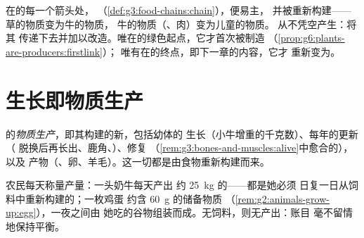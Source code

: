 \begin{remark}\label{rem:g6:matter-from-food:hands}
在的每一个箭头处，
（\cref{def:g3:food-chains:chain}），便易主，
并被重新构建——草的物质变为牛的物质，
牛的物质（、肉）变为儿童的物质。
\emph{}从不凭空产生：将其
传递下去并加以改造。唯在的绿色起点，它才首次被制造
（\cref{prop:g6:plants-are-producers:firstlink}）；
唯有在的终点，即下一章的内容，它才
重新变为。
\end{remark}

\section{生长即物质生产}

\begin{definition}[动物的物质生产]\label{def:g6:matter-from-food:production}
的\emph{物质生产}，即其构建的新，包括幼体的
生长（小牛增重的千克数）、每年的更新（
脱换后再长出、鹿角、）、修复
（\cref{rem:g3:bones-and-muscles:alive}中愈合的），以及
产物（、卵、羊毛）。这一切都是由食物重新构建而来。
\end{definition}

\begin{example}[称量物质生产]\label{ex:g6:matter-from-food:weighing}
农民每天称量产量：一头奶牛每天产出
约 \qty{25}{kg} 的——都是她必须
日复一日从饲料中重新构建的；一枚鸡蛋
约含 \qty{60}{g} 的储备物质
（\cref{rem:g2:animals-grow-up:egg}），一夜之间由
她吃的谷物组装而成。无饲料，则无产出：账目
毫不留情地保持平衡。
\end{example}

